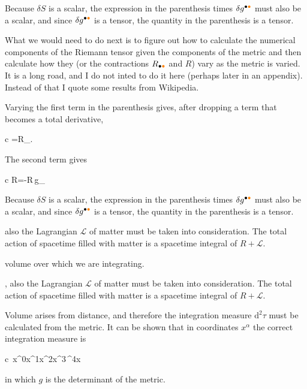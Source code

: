 \documentclass[11pt,oneside%
]{memoir}
\newenvironment{eqna}{\begin{IEEEeqnarray*}{c}}{\end{IEEEeqnarray*}\ignorespacesafterend}
\newcommand{\dd}{\mathrm{d}}
\newcommand{\coa}{{\color{black}\bullet}}
\newcommand{\cob}{{\color{oranssi}\bullet}}
\begin{document}
Because \(\delta S\) is a scalar, the expression in the parenthesis times \(\delta g^{\coa\cob}\) must also be a scalar, and since \(\delta g^{\coa\cob}\) is a tensor, the quantity in the parenthesis is a tensor. 






What we would need to do next is to figure out how to calculate the numerical components of the Riemann tensor given the components of the metric and then calculate how they (or the contractions \(R_{\coa\cob}\) and \(R\)) vary as the metric is varied. It is a long road, and I do not inted to do it here (perhaps later in an appendix). Instead of that I quote some results from Wikipedia.

Varying the first term in the parenthesis gives, after dropping a term that becomes a total derivative,
\begin{eqna}
\frac{\delta R}{\delta g^{\coa\cob}}=R_{\coa\cob}.%
\end{eqna}
The second term gives
\begin{eqna}
\frac{\delta\sqrt{|g|}}{\delta g^{\coa\cob}}R=-R\,g_{\coa\cob}
\end{eqna}


Because \(\delta S\) is a scalar, the expression in the parenthesis times \(\delta g^{\coa\cob}\) must also be a scalar, and since \(\delta g^{\coa\cob}\) is a tensor, the quantity in the parenthesis is a tensor. 



 also the Lagrangian \(\mathcal{L}\) of matter must be taken into consideration. The total action of spacetime filled with matter is a spacetime integral of \(R+\mathcal{L}\).

volume over which we are integrating.


, also the Lagrangian \(\mathcal{L}\) of matter must be taken into consideration. The total action of spacetime filled with matter is a spacetime integral of \(R+\mathcal{L}\).

Volume arises from distance, and therefore the integration measure \(\dd^2\tau\) must be calculated from the metric. It can be shown that in coordinates \(x^\alpha\) the correct integration measure is
\begin{eqna}
\,\dd x^0\dd x^1\dd x^2\dd x^3\doteq{}\,\dd^4x
\end{eqna}
in which \(g\) is the determinant of the metric.
\end{document}
